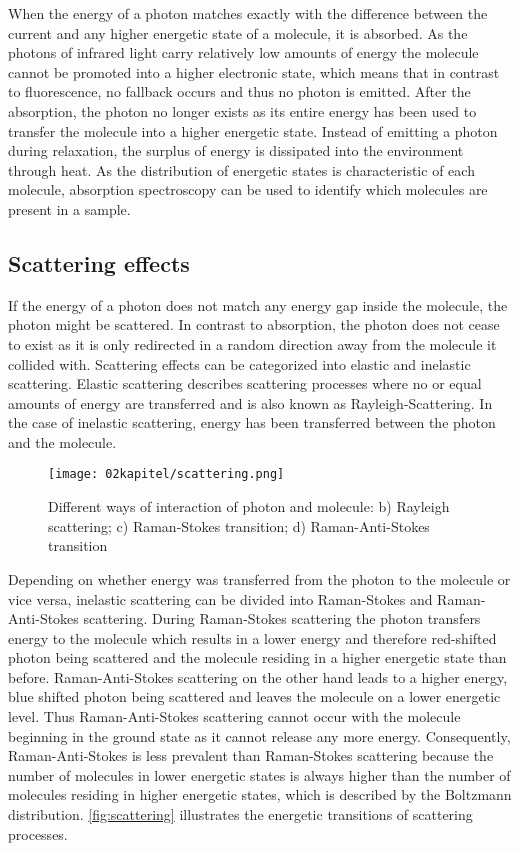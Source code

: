 When the energy of a photon matches exactly with the difference between the current and any higher energetic state of a molecule, it is absorbed. As the photons of infrared light carry relatively low amounts of energy the molecule cannot be promoted into a higher electronic state, which means that in contrast to fluorescence, no fallback occurs and thus no photon is emitted. After the absorption, the photon no longer exists as its entire energy has been used to transfer the molecule into a higher energetic state. Instead of emitting a photon during relaxation, the surplus of energy is dissipated into the environment through heat. As the distribution of energetic states is characteristic of each molecule, absorption spectroscopy can be used to identify which molecules are present in a sample.

\subsection{Scattering effects}

If the energy of a photon does not match any energy gap inside the molecule, the photon might be scattered. In contrast to absorption, the photon does not cease to exist as it is only redirected in a random direction away from the molecule it collided with. Scattering effects can be categorized into elastic and inelastic scattering. Elastic scattering describes scattering processes where no or equal amounts of energy are transferred and is also known as Rayleigh-Scattering. In the case of inelastic scattering, energy has been transferred between the photon and the molecule.

\begin{figure}[!htb]
    \centering
    \texttt{[image: 02kapitel/scattering.png]}
    \caption[Energy diagrams of scattering events]{Different ways of interaction of photon and molecule: b) Rayleigh scattering; c) Raman-Stokes transition; d) Raman-Anti-Stokes transition \autocite{brauerApplicationRamanSpectroscopy2022}}
    \label{fig:scattering}
\end{figure}

Depending on whether energy was transferred from the photon to the molecule or vice versa, inelastic scattering can be divided into Raman-Stokes and Raman-Anti-Stokes scattering. During Raman-Stokes scattering the photon transfers energy to the molecule which results in a lower energy and therefore red-shifted photon being scattered and the molecule residing in a higher energetic state than before. Raman-Anti-Stokes scattering on the other hand leads to a higher energy, blue shifted photon being scattered and leaves the molecule on a lower energetic level. Thus Raman-Anti-Stokes scattering cannot occur with the molecule beginning in the ground state as it cannot release any more energy. Consequently, Raman-Anti-Stokes is less prevalent than Raman-Stokes scattering because the number of molecules in lower energetic states is always higher than the number of molecules residing in higher energetic states, which is described by the Boltzmann distribution. \autoref{fig:scattering} illustrates the energetic transitions of scattering processes.

